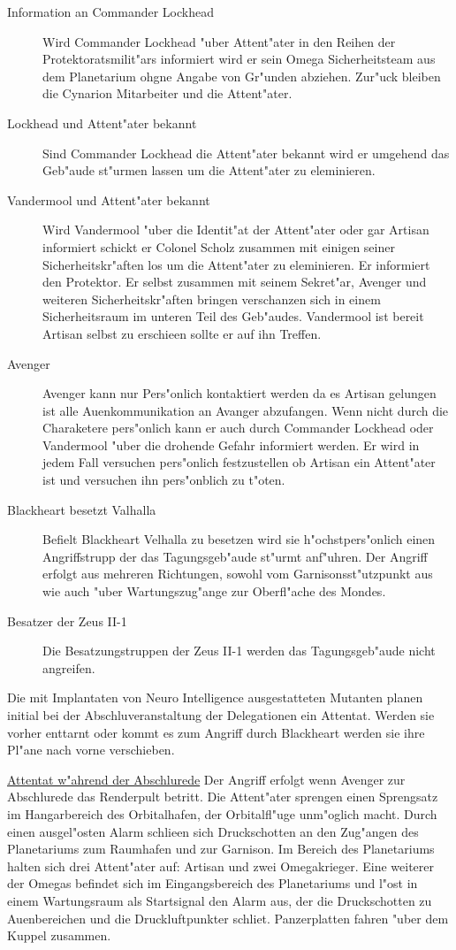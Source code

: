 \begin{description}
	\item[Information an Commander Lockhead] Wird Commander Lockhead "uber Attent"ater in den Reihen der Protektoratsmilit"ars informiert 
		wird er sein Omega Sicherheitsteam aus dem Planetarium ohgne Angabe von Gr"unden abziehen. Zur"uck bleiben die Cynarion Mitarbeiter und die Attent"ater.
	\item[Lockhead und Attent"ater bekannt] Sind Commander Lockhead die Attent"ater bekannt wird er umgehend das Geb"aude st"urmen lassen 	
		um die Attent"ater zu eleminieren.
	\item[Vandermool und Attent"ater bekannt] Wird Vandermool "uber die Identit"at der Attent"ater oder gar Artisan informiert schickt er 
		Colonel Scholz zusammen mit einigen seiner Sicherheitskr"aften los um die Attent"ater zu eleminieren. Er informiert den Protektor. Er selbst zusammen mit seinem Sekret"ar, Avenger und weiteren Sicherheitskr"aften bringen verschanzen sich in einem Sicherheitsraum im unteren Teil des Geb"audes. Vandermool ist bereit Artisan selbst zu erschie\3en sollte er auf ihn Treffen.
	\item[Avenger] Avenger kann nur Pers"onlich kontaktiert werden da es Artisan gelungen ist alle Au\3enkommunikation an Avanger 	
		abzufangen. Wenn nicht durch die Charaketere pers"onlich kann er auch durch Commander Lockhead oder Vandermool "uber die drohende Gefahr informiert werden. Er wird in jedem Fall versuchen pers"onlich festzustellen ob Artisan ein Attent"ater ist und versuchen ihn pers"onblich zu t"oten.
	\item[Blackheart besetzt Valhalla] Befielt Blackheart Velhalla zu besetzen wird sie h"ochstpers"onlich einen Angriffstrupp der das 
		Tagungsgeb"aude st"urmt anf"uhren. Der Angriff erfolgt aus mehreren Richtungen, sowohl vom Garnisonsst"utzpunkt aus wie auch "uber Wartungszug"ange zur Oberfl"ache des Mondes.
	\item[Besatzer der Zeus II-1] Die Besatzungstruppen der Zeus II-1 werden das Tagungsgeb"aude nicht angreifen.
\end{description}

Die mit Implantaten von Neuro Intelligence ausgestatteten Mutanten planen initial bei der Abschlu\3veranstaltung der Delegationen ein Attentat. Werden sie vorher enttarnt oder kommt es zum Angriff durch Blackheart werden sie ihre Pl"ane nach vorne verschieben.

\underline{Attentat w"ahrend der Abschlu\3rede} Der Angriff erfolgt wenn Avenger zur Abschlu\3rede das Renderpult betritt. Die Attent"ater sprengen einen Sprengsatz im Hangarbereich des Orbitalhafen, der Orbitalfl"uge unm"oglich macht. Durch einen ausgel"osten Alarm schlie\3en sich Druckschotten an den Zug"angen des Planetariums zum Raumhafen und zur Garnison. Im Bereich des Planetariums halten sich drei Attent"ater auf: Artisan und zwei Omegakrieger. Eine weiterer der Omegas befindet sich im Eingangsbereich des Planetariums und l"ost in einem Wartungsraum als Startsignal den Alarm aus, der die Druckschotten zu Au\3enbereichen und die Druckluftpunkter schlie\3t. Panzerplatten fahren "uber dem Kuppel zusammen.

